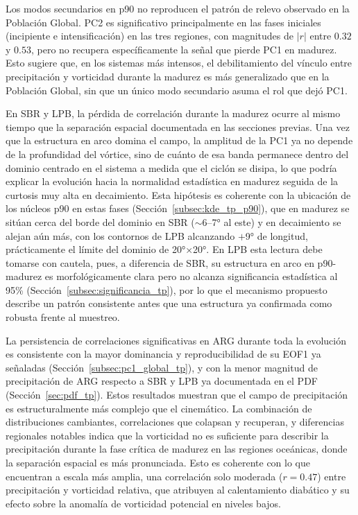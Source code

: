 Los modos secundarios en p90 no reproducen el patrón de relevo observado en la Población Global. PC2 es significativo principalmente en las fases iniciales (incipiente e intensificación) en las tres regiones, con magnitudes de $|r|$ entre $0.32$ y $0.53$, pero no recupera específicamente la señal que pierde PC1 en madurez. Esto sugiere que, en los sistemas más intensos, el debilitamiento del vínculo entre precipitación y vorticidad durante la madurez es más generalizado que en la Población Global, sin que un único modo secundario asuma el rol que dejó PC1.

En SBR y LPB, la pérdida de correlación durante la madurez ocurre al mismo tiempo que la separación espacial documentada en las secciones previas. Una vez que la estructura en arco domina el campo, la amplitud de la PC1 ya no depende de la profundidad del vórtice, sino de cuánto de esa banda permanece dentro del dominio centrado en el sistema a medida que el ciclón se disipa, lo que podría explicar la evolución hacia la normalidad estadística en madurez seguida de la curtosis muy alta en decaimiento. Esta hipótesis es coherente con la ubicación de los núcleos p90 en estas fases (Sección~\ref{subsec:kde_tp_p90}), que en madurez se sitúan cerca del borde del dominio en SBR (${\sim}$6--7° al este) y en decaimiento se alejan aún más, con los contornos de LPB alcanzando $+$9° de longitud, prácticamente el límite del dominio de 20°×20°. En LPB esta lectura debe tomarse con cautela, pues, a diferencia de SBR, su estructura en arco en p90-madurez es morfológicamente clara pero no alcanza significancia estadística al 95\% (Sección~\ref{subsec:significancia_tp}), por lo que el mecanismo propuesto describe un patrón consistente antes que una estructura ya confirmada como robusta frente al muestreo.

La persistencia de correlaciones significativas en ARG durante toda la evolución es consistente con la mayor dominancia y reproducibilidad de su EOF1 ya señaladas (Sección~\ref{subsec:pc1_global_tp}), y con la menor magnitud de precipitación de ARG respecto a SBR y LPB ya documentada en el PDF (Sección~\ref{sec:pdf_tp}).
Estos resultados muestran que el campo de precipitación es estructuralmente más complejo que el cinemático. La combinación de distribuciones cambiantes, correlaciones que colapsan y recuperan, y diferencias regionales notables indica que la vorticidad no es suficiente para describir la precipitación durante la fase crítica de madurez en las regiones oceánicas, donde la separación espacial es más pronunciada. Esto es coherente con lo que \citet{corner2025classification} encuentran a escala más amplia, una correlación solo moderada ($r = 0.47$) entre precipitación y vorticidad relativa, que atribuyen al calentamiento diabático y su efecto sobre la anomalía de vorticidad potencial en niveles bajos.

